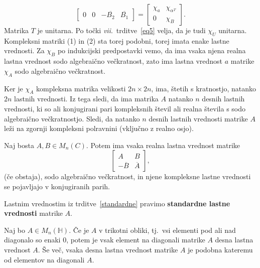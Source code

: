 \documentclass[mat1, tisk]{fmfdelo}
\numberwithin{equation}{section}
\begin{document}
\begin{dokaz}
\begin{equation}
\begin{bmatrix}
            0 & 0 & - \overline{B_2} & \overline{B_1}
        \end{bmatrix}
        =
        \begin{bmatrix}
            \chi_a & \chi_{\alpha^T} \\
            0 & \chi_B
        \end{bmatrix}.
    \end{equation}
    Matrika $T$ je unitarna. Po točki \textit{vii}.\ trditve~\ref{eq5} velja, da je tudi $\chi_U$ unitarna. Kompleksni matriki (1) in (2) sta torej podobni, torej imata enake lastne vrednosti. 
    Za $\chi_B$ po indukcijski predpostavki vemo, da ima vsaka njena realna lastna vrednost sodo algebraično
    večkratnost, zato ima lastna vrednost $a$ matrike $\chi_A$ sodo algebraično večkratnost.

    \medskip
    Ker je $\chi_A$ kompleksna matrika velikosti $2n \times 2n$, ima, štetih s kratnostjo, natanko $2n$ lastnih vrednosti. Iz tega sledi, da
    ima matrika $A$ natanko $n$ desnih lastnih vrednosti, ki so ali konjugirani pari kompleksnih števil ali realna števila s sodo algebraično večkratnostjo. Sledi, da natanko $n$ desnih lastnih vrednosti
    matrike $A$ leži na zgornji kompleksni polravnini (vključno z realno osjo).
\end{dokaz}

\begin{posledica}\label{sode lastne vrednosti}
    Naj bosta $A, B \in M_{n}(C)$. Potem ima vsaka realna lastna vrednost matrike
    $$
    \begin{bmatrix}
        A & B \\
        - \overline{B} & \overline{A}
    \end{bmatrix},
    $$
    (če obstaja), sodo algebraično večkratnost, in njene kompleksne lastne vrednosti se pojavljajo v konjugiranih parih.
\end{posledica}

\begin{opomba}
    Lastnim vrednostim iz trditve~\ref{standardne} pravimo \textbf{standardne lastne vrednosti} matrike $A$.
\end{opomba}

\begin{trditev}\label{podobne_diagonalnim}
    Naj bo $A \in M_{n}(\mathbb{H})$. Če je $A$ v trikotni obliki, tj.\ vsi elementi pod ali nad diagonalo so enaki 0,
    potem je vsak element na diagonali matrike $A$ desna lastna vrednost $A$. Še več, vsaka desna lastna 
    vrednost matrike $A$ je podobna kateremu od elementov na diagonali $A$.
\end{trditev}
\end{document}
